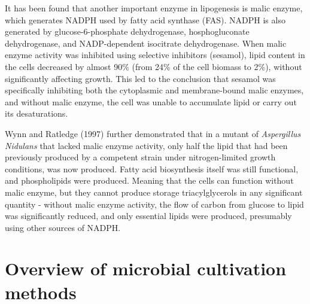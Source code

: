 It has been found that another important enzyme in lipogenesis is malic enzyme, which generates NADPH used by fatty acid synthase (FAS). 
NADPH is also generated by glucose-6-phosphate dehydrogenase, hosphogluconate dehydrogenase, and NADP-dependent isocitrate dehydrogenase. When malic enzyme activity was inhibited using selective inhibitors (sesamol), lipid content in the cells decreased by almost 90\% (from 24\% of the cell biomass to 2\%), without significantly 
affecting growth. This led to the conclusion that sesamol was specifically inhibiting both the cytoplasmic and membrane-bound malic enzymes, and without malic enzyme, the cell was unable to accumulate lipid or carry out its desaturations. \cite{Ratledge2002}

Wynn and Ratledge (1997) further demonstrated that in a mutant of \textit{Aspergillus Nidulans} that lacked malic enzyme activity, only half the lipid that had been previously produced by a competent strain under nitrogen-limited growth conditions, was now produced. Fatty acid biosynthesis itself was still functional, and phospholipids were 
produced. Meaning that the cells can function without malic enzyme, but they cannot produce storage triacylglycerols in any significant quantity - without malic enzyme activity, the flow of carbon from glucose to lipid was significantly reduced, and only essential lipids were produced, presumably using other sources of NADPH. \cite{Ratledge2002}

\section{Overview of microbial cultivation methods}




